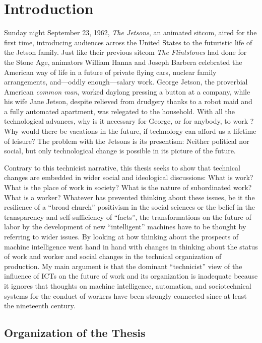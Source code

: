 \documentclass[version=last,draft=false,paper=A4,portrait,twoside=true,twocolumn=false,headinclude=false,footinclude=false,mpinclude=true,fontsize=12,BCOR=20mm,DIV=calc,pagesize=auto,open=right,chapterprefix=true,numbers=autoendperiod,headsepline=false,headings=twolinechapter,parskip=false]{scrbook}
\author{Carlos Alberto Rivera Carreño}
\date{}
\title{}
\begin{document}
\chapter{Introduction}
\label{sec:orgb707a63}
Sunday night September 23, 1962, \emph{The Jetsons}, an animated sitcom, aired for
the first time, introducing audiences across the United States to the
futuristic life of the Jetson family. Just like their previous sitcom \emph{The
Flintstones} had done for the Stone Age, animators William Hanna and Joseph
Barbera celebrated the American way of life in a future of private flying
cars, nuclear family arrangements, and---oddly enough---salary work. George
Jetson, the proverbial American \emph{common man}, worked daylong pressing a
button at a company, while his wife Jane Jetson, despite relieved from
drudgery thanks to a robot maid and a fully automated apartment, was
relegated to the household. With all the technological advances, why is it
necessary for George, or for anybody, to work ? Why would there be
vacations in the future, if technology can afford us a lifetime of leisure?
The problem with the Jetsons is its presentism: Neither political nor
social, but only technological change is possible in its picture of the
future.

Contrary to this technicist narrative, this thesis seeks to show that
technical changes are embedded in wider social and ideological discussions:
What is work? What is the place of work in society? What is the nature of
subordinated work? What is a worker? Whatever has prevented thinking about
these issues, be it the resilience of a ``broad church'' positivism in the
social sciences or the belief in the transparency and self-sufficiency of
``facts'', the transformations on the future of labor by the development of
new ``intelligent'' machines have to be thought by referring to wider
issues. By looking at how thinking about the prospects of machine
intelligence went hand in hand with changes in thinking about the status of
work and worker and social changes in the technical organization of
production. My main argument is that the dominant ``technicist'' view of the
influence of ICTs on the future of work and its organization is inadequate
because it ignores that thoughts on machine intelligence, automation, and
sociotechnical systems for the conduct of workers have been strongly
connected since at least the nineteenth century.

\section{Organization of the Thesis}
\label{sec:orga868409}
\end{document}
